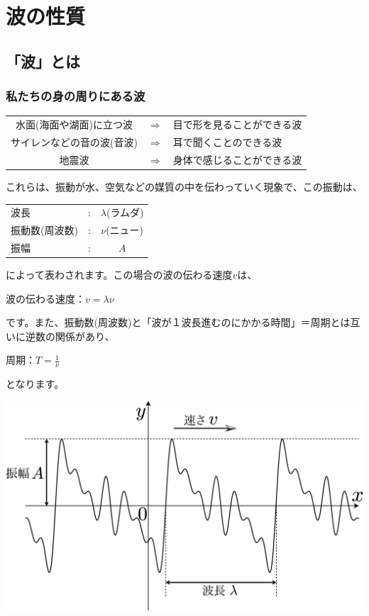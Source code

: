 %
%


\section{波の性質}

\subsection{「波」とは}

\subsubsection*{私たちの身の周りにある波}

\begin{center}
\begin{tabular}{ccl}
水面(海面や湖面)に立つ波 & $\Rightarrow$ & 目で形を見ることができる波\\
サイレンなどの音の波(音波) &  $\Rightarrow$ & 耳で聞くことのできる波\\
地震波 & $\Rightarrow$ & 身体で感じることができる波
\end{tabular}
\end{center}

これらは、振動が水、空気などの媒質の中を伝わっていく現象で、この振動は、
\begin{center}
\begin{tabular}{lcc}
波長 &:&$\lambda$(ラムダ)\\
振動数(周波数)&:&$\nu$(ニュー)\\
振幅&:&$A$\\
\end{tabular}
\end{center}
によって表わされます。この場合の波の伝わる速度$v$は、
\begin{center}
波の伝わる速度：$v=\lambda \nu$
\end{center}
です。また、振動数(周波数)と「波が１波長進むのにかかる時間」＝周期とは互いに逆数の関係があり、
\begin{center}
周期：$T=\frac{1}{\nu}$
\end{center}
となります。
\begin{center}
\includegraphics[scale=0.18]{01_Wave/wave1.eps}
\end{center}

